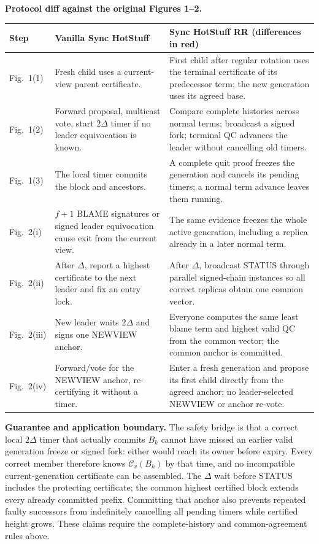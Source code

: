 \documentclass[10pt,a4paper]{article}
\newcommand{\RR}[1]{{\color{red!70!black}#1}}
\newcommand{\cert}{\mathcal C}
\begin{document}
\textbf{Protocol diff against the original Figures 1--2.}
\begin{center}\small
\begin{tabularx}{\linewidth}{@{}>{\raggedright\arraybackslash}p{.15\linewidth}Y Y@{}}
\toprule
Step & Vanilla Sync HotStuff & Sync HotStuff RR (differences in red)\\\midrule
Fig.~1(1) & Fresh child uses a current-view parent certificate. &
\RR{First child after regular rotation uses the terminal certificate of
its predecessor term; the new generation uses its agreed base.}\\
Fig.~1(2) & Forward proposal, multicast vote, start $2\Delta$ timer
if no leader equivocation is known. &
\RR{Compare complete histories across normal terms; broadcast a signed
fork; terminal QC advances the leader without cancelling old timers.}\\
Fig.~1(3) & The local timer commits the block and ancestors. &
\RR{A complete quit proof freezes the generation and cancels its pending
timers; a normal term advance leaves them running.}\\
Fig.~2(i) & $f+1$ BLAME signatures or signed leader equivocation cause exit
from the current view. &
\RR{The same evidence freezes the whole active generation, including a
replica already in a later normal term.}\\
Fig.~2(ii) & After $\Delta$, report a highest certificate to the next
leader and fix an entry lock. &
\RR{After $\Delta$, broadcast STATUS through parallel signed-chain
instances so all correct replicas obtain one common vector.}\\
Fig.~2(iii) & New leader waits $2\Delta$ and signs one NEWVIEW anchor. &
\RR{Everyone computes the same least blame term and highest valid QC from
the common vector; the common anchor is committed.}\\
Fig.~2(iv) & Forward/vote for the NEWVIEW anchor, re-certifying it without a
timer. &
\RR{Enter a fresh generation and propose its first child directly from
the agreed anchor; no leader-selected NEWVIEW or anchor re-vote.}\\\bottomrule
\end{tabularx}
\end{center}

\textbf{Guarantee and application boundary.}
The safety bridge is that a correct local $2\Delta$ timer that actually
commits $B_k$ cannot have missed an earlier valid generation freeze or
signed fork: either would reach its owner before expiry. Every correct
member therefore knows $\cert_v(B_k)$ by that time, and no incompatible
current-generation certificate can be assembled. The $\Delta$ wait before
STATUS includes the protecting certificate; the common highest certified
block extends every already committed prefix. Committing that anchor also
prevents repeated faulty successors from indefinitely cancelling all
pending timers while certified height grows. These claims require the
complete-history and common-agreement rules above.
\end{document}
